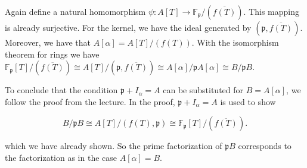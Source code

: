 \documentclass[a4paper]{article}
\theoremstyle{definition}
\begin{document}
\bigskip

Again define a natural homomorphism \(\psi: A[T] \rightarrow \mathbb{F}_\mathfrak{p} / (\overline{f(T)})\). This mapping is already surjective. For the kernel, we have the ideal generated by \((\mathfrak{p}, \overline{f(T)})\). Moreover, we have that \(A[\alpha] = A[T] / (f(T))\). With the isomorphism theorem for rings we have \(\mathbb{F}_{\mathfrak{p}}[T] / (\overline{f(T)}) \cong A[T] / (\mathfrak{p}, \overline{f(T)}) \cong A[\alpha] /\mathfrak{p}A[\alpha] \cong B / \mathfrak{p} B \).

To conclude that the condition \(\mathfrak{p} + I_\alpha = A\) can be substituted for \(B = A[\alpha]\), we follow the proof from the lecture. In the proof, \(\mathfrak{p} + I_\alpha = A\) is used to show

\begin{equation}
    B / \mathfrak{p} B \cong A[T] / (f(T), \mathfrak{p}) \cong \mathbb{F}_\mathfrak{p}[T] / (\overline{f(T)}) \text{.}
\end{equation}

which we have already shown. So the prime factorization of \(\mathfrak{p}B\) corresponds to the factorization as in the case \(A[\alpha] = B\).
\end{document}
